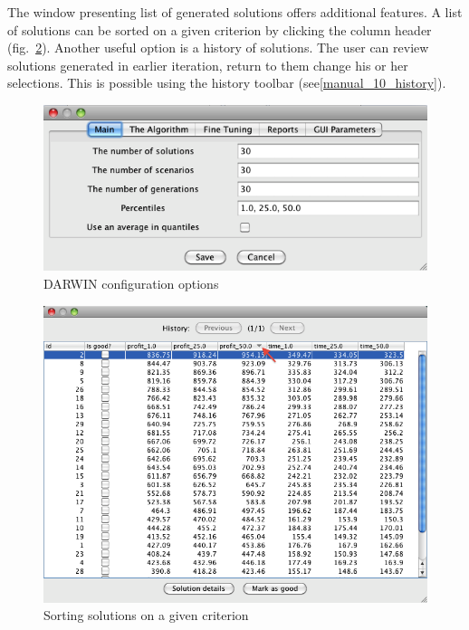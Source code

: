 The window presenting list of generated solutions offers additional
features. A list of solutions can be sorted on a given criterion by clicking
the column header (fig.~\ref{manual_09_sorton}). Another useful option is a
history of solutions. The user can review solutions generated in earlier
iteration, return to them change his or her selections. This is possible using
the history toolbar (see\ref{manual_10_history}).

\begin{figure}
  \centering
  \includegraphics[scale=0.7]{img/manual/08_options}
  \caption{DARWIN configuration options}
  \label{manual_08_options}
\end{figure}

\begin{figure}
  \centering
  \includegraphics[scale=0.7]{img/manual/09_sorton}
  \caption{Sorting solutions on a given criterion}
  \label{manual_09_sorton}
\end{figure}

